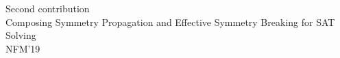 \documentclass{beamer}
\begin{document}
%
%

\begin{frame}
	\centering
	\textcolor{UPMCEngagementBlueB}{\Large Second contribution }\\
	\vspace{2em}
	\textcolor{UPMCEngagementBlueB}{\Large Composing Symmetry Propagation and Effective Symmetry Breaking for SAT Solving }\\
	\vspace{2em}
	\textcolor{UPMCEngagementBlueB}{\Large  NFM'19~\cite{metin2019composing}}
\end{frame}
\end{document}
